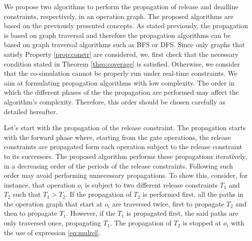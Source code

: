 We propose two algorithms to perform the propagation of release and deadline constraints, respectively, in an operation graph. The proposed algorithms are based on the previously presented concepts. As stated previously, the propagation is based on graph traversal and therefore the propagation algorithms can be based on graph traversal algorithms such as BFS or DFS. Since only graphs that satisfy Property \ref{prop:constr} are considered, we, first check that the necessary condition stated in Theorem \ref{theo:coverage} is satisfied. Otherwise, we consider that the co-simulation cannot be properly run under real-time constraints. We aim at formulating propagation algorithms with low complexity. The order in which the different phases of the the propagation are performed may affect the algorithm's complexity. Therefore, this order should be chosen carefully as detailed hereafter.

Let's start with the propagation of the release constraint. The propagation starts with the forward phase where, starting from the gate operations, the release constraints are propagated form each operation subject to the release constraint to its successors. The proposed algorithm performs these propagations iteratively, in a decreasing order of the periods of the release constraints. Following such order may avoid performing unnecessary propagations. To show this, consider, for instance, that operation $o_i$ is subject to two different release constraints $T_{1}$ and $T_{2}$ such that $T_{1} > T_{2}$. If the propagation of $T_{2}$ is performed first, all the paths in the operation graph that start at $o_i$ are traversed twice, first to propagate $T_{2}$ and then to propagate $T_{1}$. However, if the $T_{1}$ is propagated first, the said paths are only traversed once, propagating $T_{1}$. The propagation of $T_{2}$ is stopped at $o_i$ with the use of expression \ref{eq:mulrel}.

